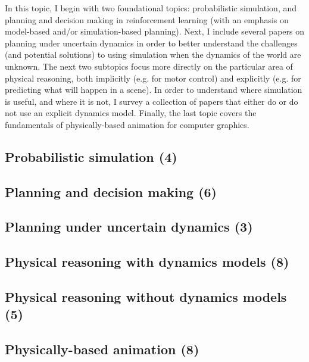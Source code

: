 \documentclass{article}
\begin{document}
In this topic, I begin with two foundational topics: probabilistic simulation, and planning and decision making in reinforcement learning (with an emphasis on model-based and/or simulation-based planning).
Next, I include several papers on planning under uncertain dynamics in order to better understand the challenges (and potential solutions) to using simulation when the dynamics of the world are unknown.
The next two subtopics focus more directly on the particular area of physical reasoning, both implicitly (e.g. for motor control) and explicitly (e.g. for predicting what will happen in a scene).
In order to understand where simulation is useful, and where it is not, I survey a collection of papers that either do or do not use an explicit dynamics model.
Finally, the last topic covers the fundamentals of physically-based animation for computer graphics.

\subsection{Probabilistic simulation (4)}

\subsection{Planning and decision making (6)}

\subsection{Planning under uncertain dynamics (3)}

\subsection{Physical reasoning with dynamics models (8)}

\subsection{Physical reasoning without dynamics models (5)}

\subsection{Physically-based animation (8)}
\end{document}
